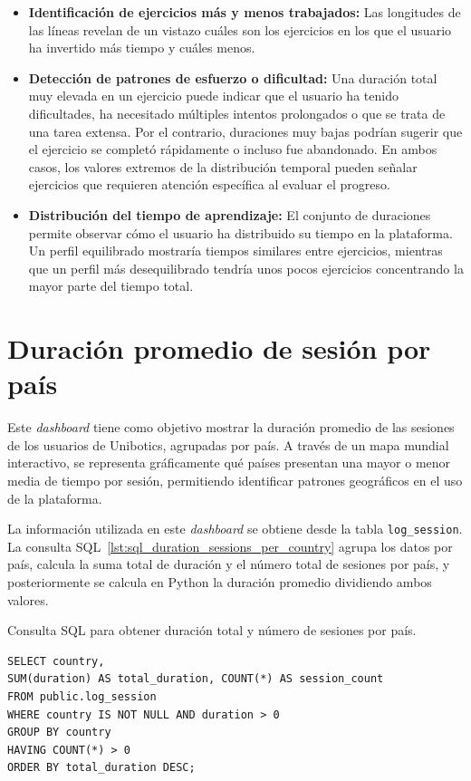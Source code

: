 \documentclass[a4paper, 12pt]{book}
\begin{document}
\begin{itemize}
  \item \textbf{Identificación de ejercicios más y menos trabajados:} Las longitudes de las líneas revelan de un vistazo cuáles son los ejercicios en los que el usuario ha invertido más tiempo y cuáles menos.

  \item \textbf{Detección de patrones de esfuerzo o dificultad:} Una duración total muy elevada en un ejercicio puede indicar que el usuario ha tenido dificultades, ha necesitado múltiples intentos prolongados o que se trata de una tarea extensa. Por el contrario, duraciones muy bajas podrían sugerir que el ejercicio se completó rápidamente o incluso fue abandonado. En ambos casos, los valores extremos de la distribución temporal pueden señalar ejercicios que requieren atención específica al evaluar el progreso.

  \item \textbf{Distribución del tiempo de aprendizaje:} El conjunto de duraciones permite observar cómo el usuario ha distribuido su tiempo en la plataforma. Un perfil equilibrado mostraría tiempos similares entre ejercicios, mientras que un perfil más desequilibrado tendría unos pocos ejercicios concentrando la mayor parte del tiempo total.
\end{itemize}



\section{Duración promedio de sesión por país}
\label{sec:dash1c}

Este \textit{dashboard} tiene como objetivo mostrar la duración promedio de las sesiones de los usuarios de Unibotics, agrupadas por país. A través de un mapa mundial interactivo, se representa gráficamente qué países presentan una mayor o menor media de tiempo por sesión, permitiendo identificar patrones geográficos en el uso de la plataforma.

La información utilizada en este \textit{dashboard} se obtiene desde la tabla \texttt{log\_session}. La consulta SQL~\ref{lst:sql_duration_sessions_per_country} agrupa los datos por país, calcula la suma total de duración y el número total de sesiones por país, y posteriormente se calcula en Python la duración promedio dividiendo ambos valores.

\begin{listing}[h!]
\caption{Consulta SQL para obtener duración total y número de sesiones por país.}
\label{lst:sql_duration_sessions_per_country}
\begin{verbatim}
SELECT country, 
SUM(duration) AS total_duration, COUNT(*) AS session_count 
FROM public.log_session
WHERE country IS NOT NULL AND duration > 0
GROUP BY country
HAVING COUNT(*) > 0  
ORDER BY total_duration DESC;
\end{verbatim}
\end{listing}
\end{document}
